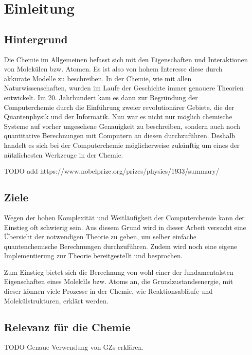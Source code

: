 \chapter{Einleitung}
\section{Hintergrund}
Die Chemie im Allgemeinen befasst sich mit den Eigenschaften und Interaktionen
von Molekülen bzw. Atomen. Es ist also von hohem Interesse diese
durch akkurate Modelle zu beschreiben. In der Chemie, wie mit allen
Naturwissenschaften, wurden im Laufe der Geschichte immer genauere Theorien entwickelt.
Im 20. Jahrhundert kam es dann zur Begründung der Computerchemie durch die Einführung zweier 
revolutionärer Gebiete, die der Quantenphysik und der Informatik.
Nun war es nicht nur möglich chemische Systeme auf vorher ungesehene Genauigkeit zu beschreiben,
sondern auch noch quantitative Berechnungen mit Computern an diesen durchzuführen.
Deshalb handelt es sich bei der Computerchemie möglicherweise zukünftig
um eines der nützlichesten Werkzeuge in der Chemie.

TODO add https://www.nobelprize.org/prizes/physics/1933/summary/

\section{Ziele}
Wegen der hohen Komplexität und Weitläufigkeit der Computerchemie
kann der Einstieg oft schwierig sein. Aus diesem Grund wird
in dieser Arbeit versucht eine Übersicht der notwendigen Theorie zu geben,
um selber einfache quantenchemische Berechnungen durchzuführen.
Zudem wird noch eine eigene Implementierung
zur Theorie bereitgestellt und besprochen.

Zum Einstieg bietet sich die Berechnung von wohl einer der fundamentalsten Eigenschaften 
eines Moleküls bzw. Atoms an, die Grundzustandsenergie, 
mit dieser können viele Prozesse in der Chemie,
wie Reaktionsabläufe und Molekülstrukturen, erklärt werden.
\section{Relevanz für die Chemie}
TODO Genaue Verwendung von GZs erklären. 